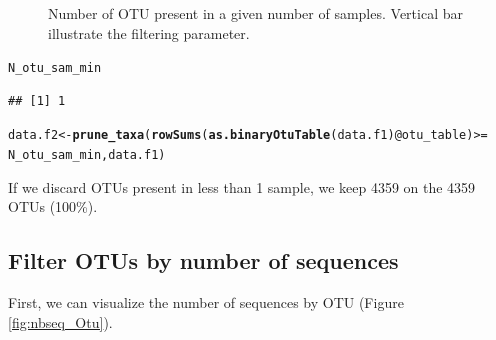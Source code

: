 \documentclass[12pt]{article}\usepackage[]{graphicx}\usepackage[]{color}
\makeatletter
\newcommand{\hlopt}[1]{\textcolor[rgb]{0,0,0}{#1}}%
\newcommand{\hlstd}[1]{\textcolor[rgb]{0.345,0.345,0.345}{#1}}%
\newcommand{\hlkwb}[1]{\textcolor[rgb]{0.69,0.353,0.396}{#1}}%
\newcommand{\hlkwc}[1]{\textcolor[rgb]{0.333,0.667,0.333}{#1}}%
\newcommand{\hlkwd}[1]{\textcolor[rgb]{0.737,0.353,0.396}{\textbf{#1}}}%
\newenvironment{kframe}{%
 \def\at@end@of@kframe{}%
 \ifinner\ifhmode%
  \def\at@end@of@kframe{\end{minipage}}%
  \begin{minipage}{\columnwidth}%
 \fi\fi%
 \def\FrameCommand##1{\hskip\@totalleftmargin \hskip-\fboxsep
 \colorbox{shadecolor}{##1}\hskip-\fboxsep
     \hskip-\linewidth \hskip-\@totalleftmargin \hskip\columnwidth}%
 \MakeFramed {\advance\hsize-\width
   \@totalleftmargin\z@ \linewidth\hsize
   \@setminipage}}%
 {\par\unskip\endMakeFramed%
 \at@end@of@kframe}
\newenvironment{knitrout}{}{} %
\numberwithin{figure}{section}
\makeatother
\begin{document}
\begin{knitrout}
\begin{figure}
{}

\caption[Number of OTU present in a given number of samples]{Number of OTU present in a given number of samples. Vertical bar illustrate the filtering parameter.}\label{fig:nbOtu_sample}
\end{figure}


\end{knitrout}

\begin{knitrout}\small
{}\color{fgcolor}\begin{kframe}
\begin{alltt}
\hlstd{N_otu_sam_min}
\end{alltt}
\begin{verbatim}
## [1] 1
\end{verbatim}
\end{kframe}
\end{knitrout}

\begin{knitrout}\small
{}\color{fgcolor}\begin{kframe}
\begin{alltt}
\hlstd{data.f2} \hlkwb{<-} \hlkwd{prune_taxa}\hlstd{(}\hlkwd{rowSums}\hlstd{(}\hlkwd{as.binaryOtuTable}\hlstd{(data.f1)}\hlopt{@}\hlkwc{otu_table}\hlstd{)} \hlopt{>=}
                        \hlstd{N_otu_sam_min, data.f1)}
\end{alltt}
\end{kframe}
\end{knitrout}

If we discard OTUs present in less than 1 sample, we keep 4359 on the 4359 OTUs (100\%).

 \subsection{Filter OTUs by number of sequences}

 First, we can visualize the number of sequences by OTU (Figure \ref{fig:nbseq_Otu}).
\end{document}
